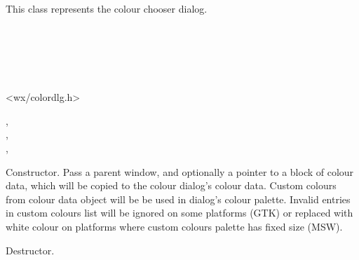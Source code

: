 \section{}\label{wxcolourdialog}

This class represents the colour chooser dialog.


\\
\\
\\
\\


<wx/colordlg.h>




,\\
,\\
,\\


\label{wxcolourdialogctor}


Constructor. Pass a parent window, and optionally a pointer to a block of colour
data, which will be copied to the colour dialog's colour data. Custom
colours from colour data object will be be used in dialog's colour palette.
Invalid entries in custom colours list will be ignored on some platforms (GTK)
or replaced with white colour on platforms where custom colours palette has
fixed size (MSW).



\label{wxcolourdialogdtor}


Destructor.

